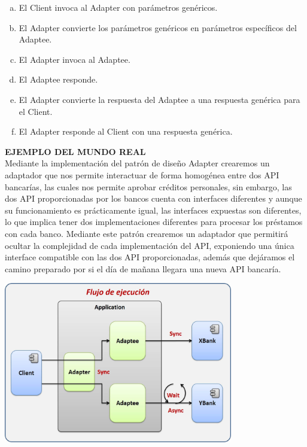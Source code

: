 \begin{flushleft}
\begin{enumerate}[a)]
\item El Client invoca al Adapter con parámetros genéricos.
\item El Adapter convierte los parámetros genéricos en parámetros específicos del Adaptee.
\item El Adapter invoca al Adaptee.
\item El Adaptee responde.
\item El Adapter convierte la respuesta del Adaptee a una respuesta genérica para el Client.
\item El Adapter responde al Client con una respuesta genérica.
\end{enumerate}
\vfill
\textbf{         EJEMPLO DEL MUNDO REAL}
\\ Mediante la implementación del patrón de diseño Adapter crearemos un adaptador que nos permite interactuar de forma homogénea entre dos API bancarías, las cuales nos permite aprobar créditos personales, sin embargo, las dos API proporcionadas por los bancos cuenta con interfaces diferentes y aunque su funcionamiento es prácticamente igual, las interfaces expuestas son diferentes, lo que implica tener dos implementaciones diferentes para procesar los préstamos con cada banco. Mediante este patrón crearemos un adaptador que permitirá ocultar la complejidad de cada implementación del API, exponiendo una única interface compatible con las dos API proporcionadas, además que dejáramos el camino preparado por si el día de mañana llegara una nueva API bancaría.
          \begin{center}
	\includegraphics[width=10cm]{./Imagenes/adapter3} 
	\end{center}
	




\end{flushleft}
